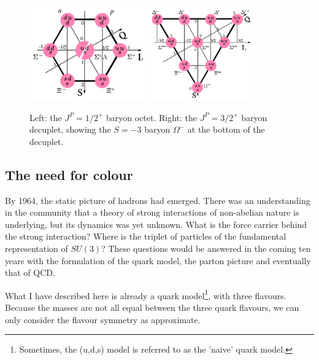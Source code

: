 \begin{figure}[h]
\begin{center}
  \includegraphics[width=0.45\textwidth]{Chapters/pQCD/Baryon-octet.png}
  \includegraphics[width=0.4\textwidth]{Chapters/pQCD/Baryon-decuplet.png}
 \caption{Left: the $J^P = 1/2^{+}$ baryon octet. Right: the $J^P =
   3/2^{+}$ baryon decuplet, showing the $S=-3$ baryon $\Omega^-$ at
   the bottom of the decuplet.%
 }
 \label{fig:baryonoctet}
\end{center}
\end{figure}

\subsection{The need for colour}
\label{sec:colour}
By 1964, the static picture of hadrons had emerged. There was an
understanding in the community that a theory of strong interactions
of non-abelian nature
is underlying, but its dynamics
was yet unknown. What is the force carrier behind the strong
interaction? Where is the triplet of particles of the fundamental
representation of $SU(3)$? These questions would be answered in the
coming ten years with the formulation of the quark model, the parton
picture and
eventually that of QCD.

What I have described here is already a quark
model\footnote{Sometimes, the (u,d,s) model is referred to as
  the 'naive' quark model.}, with three
flavours. Because the masses are not all equal between the
three quark flavours, we can only consider the flavour symmetry as
approximate. %

